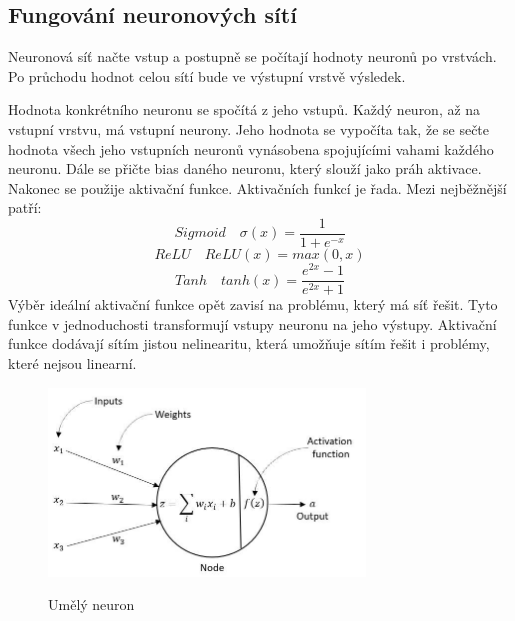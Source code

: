 \subsection{Fungování neuronových sítí}
Neuronová síť načte vstup a postupně se počítají hodnoty neuronů po vrstvách.
Po průchodu hodnot celou sítí bude ve výstupní vrstvě výsledek.

Hodnota konkrétního neuronu se spočítá z jeho vstupů. Každý neuron, až na vstupní vrstvu, má vstupní neurony.
Jeho hodnota se vypočíta tak, že se sečte hodnota všech jeho vstupních neuronů vynásobena spojujícími vahami každého neuronu.
Dále se přičte bias daného neuronu, který slouží jako práh aktivace. Nakonec se použije aktivační funkce.
Aktivačních funkcí je řada.
Mezi nejběžnější patří:
\[Sigmoid\quad \sigma(x) = \frac{1}{1 + e^{-x}}\]
\[ReLU\quad ReLU(x) = max(0, x)\]
\[Tanh\quad tanh(x) = \frac{e^{2x} - 1}{e^{2x} + 1}\]
Výběr ideální aktivační funkce opět zavisí na problému, který má síť řešit.
Tyto funkce v jednoduchosti transformují vstupy neuronu na jeho výstupy.
Aktivační funkce dodávají sítím jistou nelinearitu, která umožňuje sítím řešit i problémy, které nejsou linearní.

\begin{figure}[h]
    \centering
    \includegraphics[width=0.75\textwidth]{images/neuron.jpg}
    \caption{Umělý neuron}\cite{umely_neuron}
\end{figure}

\newpage
